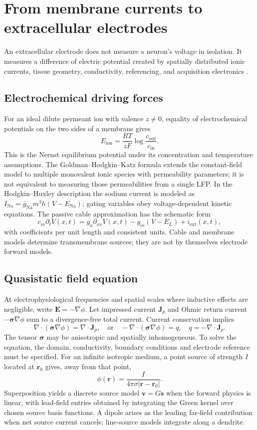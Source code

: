 \chapter[Extracellular fields and inverse problems]{From membrane currents to extracellular electrodes}
\label{ch:electrode-physics}
An extracellular electrode does not measure a neuron's voltage
in isolation. It measures a difference of electric potential
created by spatially distributed ionic currents, tissue geometry,
conductivity, referencing, and acquisition electronics
\cite{buzsaki2012,einevoll2013}.

\section{Electrochemical driving forces}
For an ideal dilute permeant ion with valence $z\ne0$, equality
of electrochemical potentials on the two sides of a membrane gives
\[
E_{\mathrm{ion}}=\frac{RT}{zF}
  \log\frac{c_{\mathrm{out}}}{c_{\mathrm{in}}}.
\]
This is the Nernst equilibrium potential under its concentration
and temperature assumptions. The Goldman--Hodgkin--Katz formula
extends the constant-field model to multiple monovalent ionic
species with permeability parameters; it is not equivalent to
measuring those permeabilities from a single LFP.
In the Hodgkin--Huxley description the sodium current is modeled
as $I_{\mathrm{Na}}=\bar g_{\mathrm{Na}}m^3h(V-E_{\mathrm{Na}})$;
gating variables obey voltage-dependent kinetic equations.
The passive cable approximation has the schematic form
\[
c_m\partial_t V(x,t)=g_a\partial_{xx}V(x,t)
   -g_m(V-E_L)+i_{\mathrm{ext}}(x,t),
\]
with coefficients per unit length and consistent units.
Cable and membrane models determine transmembrane sources; they
are not by themselves electrode forward models.

\section{Quasistatic field equation}
At electrophysiological frequencies and spatial scales where
inductive effects are negligible, write $\mathbf E=-\nabla\phi$.
Let impressed current $\mathbf J_p$ and Ohmic return current
$-\boldsymbol\sigma\nabla\phi$ sum to a divergence-free total
current. Current conservation implies
\[
\nabla\!\cdot(\boldsymbol\sigma\nabla\phi)
       =\nabla\!\cdot\mathbf J_p,
\quad\text{or}\quad
-\nabla\!\cdot(\boldsymbol\sigma\nabla\phi)=q,
\quad q=-\nabla\!\cdot\mathbf J_p.
\]
The tensor $\boldsymbol\sigma$ may be anisotropic and spatially
inhomogeneous. To solve the equation, the domain, conductivity,
boundary conditions and electrode reference must be specified.
For an infinite isotropic medium, a point source of strength $I$
located at $\mathbf r_0$ gives, away from that point,
\[
\phi(\mathbf r)=\frac{I}{4\pi\sigma
  |\mathbf r-\mathbf r_0|}.
\]
Superposition yields a discrete source model $\mathbf v=G\mathbf s$
when the forward physics is linear, with lead-field entries obtained
by integrating the Green kernel over chosen source basis functions.
A dipole arises as the leading far-field contribution when net
source current cancels; line-source models integrate along a dendrite.

